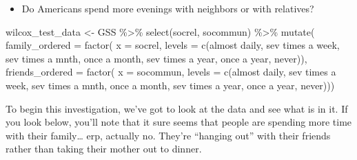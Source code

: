 \documentclass[
  letterpaper,
  DIV=11,
  numbers=noendperiod]{scrreprt}
\newenvironment{Shaded}{\begin{snugshade}}{\end{snugshade}}
\newcommand{\AttributeTok}[1]{\textcolor[rgb]{0.40,0.45,0.13}{#1}}
\newcommand{\FunctionTok}[1]{\textcolor[rgb]{0.28,0.35,0.67}{#1}}
\newcommand{\NormalTok}[1]{\textcolor[rgb]{0.00,0.23,0.31}{#1}}
\newcommand{\OtherTok}[1]{\textcolor[rgb]{0.00,0.23,0.31}{#1}}
\newcommand{\SpecialCharTok}[1]{\textcolor[rgb]{0.37,0.37,0.37}{#1}}
\newcommand{\StringTok}[1]{\textcolor[rgb]{0.13,0.47,0.30}{#1}}
\providecommand{\tightlist}{%
  \setlength{\itemsep}{0pt}\setlength{\parskip}{0pt}}\usepackage{longtable,booktabs,array}
\begin{document}
\begin{itemize}
\tightlist
\item
  Do Americans spend more evenings with neighbors or with relatives?
\end{itemize}

\begin{Shaded}
\begin{Highlighting}[]
\NormalTok{wilcox\_test\_data }\OtherTok{\textless{}{-}}\NormalTok{ GSS }\SpecialCharTok{\%\textgreater{}\%} 
  \FunctionTok{select}\NormalTok{(socrel, socommun) }\SpecialCharTok{\%\textgreater{}\%}
  \FunctionTok{mutate}\NormalTok{(}
    \AttributeTok{family\_ordered =} \FunctionTok{factor}\NormalTok{(}
      \AttributeTok{x      =}\NormalTok{ socrel, }
      \AttributeTok{levels =} \FunctionTok{c}\NormalTok{(}\StringTok{\textquotesingle{}almost daily\textquotesingle{}}\NormalTok{, }\StringTok{\textquotesingle{}sev times a week\textquotesingle{}}\NormalTok{, }
                 \StringTok{\textquotesingle{}sev times a mnth\textquotesingle{}}\NormalTok{, }\StringTok{\textquotesingle{}once a month\textquotesingle{}}\NormalTok{,}
                 \StringTok{\textquotesingle{}sev times a year\textquotesingle{}}\NormalTok{, }\StringTok{\textquotesingle{}once a year\textquotesingle{}}\NormalTok{, }\StringTok{\textquotesingle{}never\textquotesingle{}}\NormalTok{)),}
    \AttributeTok{friends\_ordered =} \FunctionTok{factor}\NormalTok{(}
      \AttributeTok{x      =}\NormalTok{ socommun, }
      \AttributeTok{levels =} \FunctionTok{c}\NormalTok{(}\StringTok{\textquotesingle{}almost daily\textquotesingle{}}\NormalTok{, }\StringTok{\textquotesingle{}sev times a week\textquotesingle{}}\NormalTok{, }
                 \StringTok{\textquotesingle{}sev times a mnth\textquotesingle{}}\NormalTok{, }\StringTok{\textquotesingle{}once a month\textquotesingle{}}\NormalTok{,}
                 \StringTok{\textquotesingle{}sev times a year\textquotesingle{}}\NormalTok{, }\StringTok{\textquotesingle{}once a year\textquotesingle{}}\NormalTok{, }\StringTok{\textquotesingle{}never\textquotesingle{}}\NormalTok{))) }
\end{Highlighting}
\end{Shaded}

To begin this investigation, we've got to look at the data and see what
is in it. If you look below, you'll note that it sure seems that people
are spending more time with their family\ldots{} erp, actually no.
They're ``hanging out'' with their friends rather than taking their
mother out to dinner.
\end{document}
